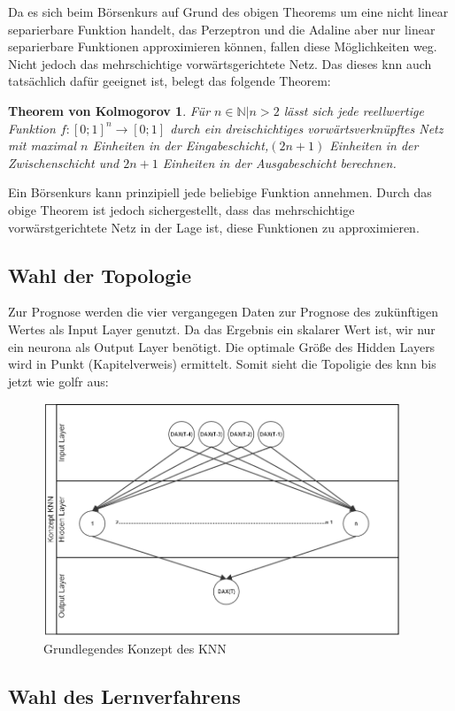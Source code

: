 Da es sich beim Börsenkurs auf Grund des obigen Theorems um eine nicht linear separierbare Funktion handelt, das Perzeptron und die Adaline aber nur linear separierbare Funktionen approximieren können, fallen diese Möglichkeiten weg. Nicht jedoch das mehrschichtige vorwärtsgerichtete Netz. Das dieses \ac{knn} auch tatsächlich dafür geeignet ist, belegt das folgende Theorem:


\newtheorem*{theorem1*}{Theorem von Kolmogorov}
\begin{theorem1*}
Für ${n \in \mathbb{N} | n>2}$ lässt sich jede reellwertige Funktion $f:[0;1]^n\rightarrow[0;1]$ durch ein dreischichtiges vorwärtsverknüpftes Netz mit maximal $n$ Einheiten in der Eingabeschicht,$(2n+1)$ Einheiten in der Zwischenschicht und $2n+1$ Einheiten in der Ausgabeschicht berechnen.
\end{theorem1*}

Ein Börsenkurs kann prinzipiell jede beliebige Funktion annehmen. Durch das obige Theorem ist jedoch sichergestellt, dass das mehrschichtige vorwärstgerichtete Netz in der Lage ist, diese Funktionen zu approximieren.


\subsection{Wahl der Topologie}
\label{subsection:Wahl der Topologie}

Zur Prognose werden die vier vergangegen Daten zur Prognose des zukünftigen Wertes als Input Layer genutzt. Da das Ergebnis ein skalarer Wert ist, wir nur ein neurona als Output Layer benötigt. Die optimale Größe des Hidden Layers wird in Punkt (Kapitelverweis) ermittelt. Somit sieht die Topoligie des knn bis jetzt wie golfr aus:

\begin{figure}[H]
\centering
		\includegraphics[width=0.95\textwidth]{KonzeptKNN.PNG}
	\caption{Grundlegendes Konzept des KNN}
	\label{fig:Grundlegendes Konzept des KNN}
\end{figure}

\subsection{Wahl des Lernverfahrens} 
\label{subsection:Wahl des Lernverfahrens} 

